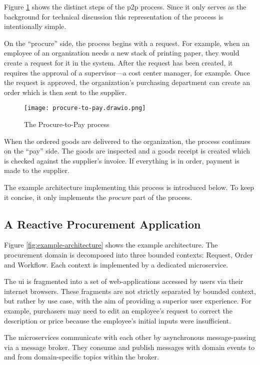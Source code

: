 Figure \ref{fig:procure-to-pay} shows the distinct steps of the \gls{p2p} process.
Since it only serves as the background for technical discussion this representation of the process is intentionally simple.

On the \enquote{procure} side, the process begins with a request.
For example, when an employee of an organization needs a new stack of printing paper, they would create a request for it in the system.
After the request has been created, it requires the approval of a supervisor---a cost center manager, for example.
Once the request is approved, the organization's purchasing department can create an order which is then sent to the supplier.

\begin{figure}[h]
  \centering
  \texttt{[image: procure-to-pay.drawio.png]}
  \caption{The Procure-to-Pay process}\label{fig:procure-to-pay}
\end{figure}

When the ordered goods are delivered to the organization, the process continues on the \enquote{pay} side.
The goods are inspected and a goods receipt is created which is checked against the supplier's invoice.
If everything is in order, payment is made to the supplier.

The example architecture implementing this process is introduced below.
To keep it concise, it only implements the \emph{procure} part of the process.

\subsection{A Reactive Procurement Application}\label{sec:application}

Figure \ref{fig:example-architecture} shows the example architecture.
The procurement domain is decomposed into three bounded contexts: Request, Order and Workflow.
Each context is implemented by a dedicated microservice.

The \gls{ui} is fragmented into a set of web-applications accessed by users via their internet browsers.
These fragments are not strictly separated by bounded context, but rather by use case, with the aim of providing a superior user experience.
For example, purchasers may need to edit an employee's request to correct the description or price because the employee's initial inputs were insufficient.

The microservices communicate with each other by asynchronous message-passing via a message broker.
They consume and publish messages with domain events to and from domain-specific topics within the broker.

